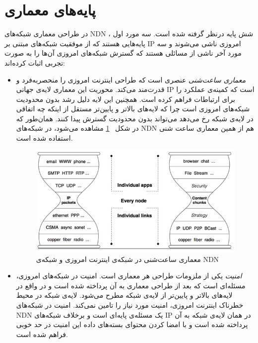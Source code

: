 \section{پایه‌های معماری}
در طراحی معماری شبکه‌های NDN ، شش پایه درنظر گرفته شده است. سه مورد اول پایه‌هایی هستند که از موفقیت شبکه‌های مبتنی بر IP امروزی ناشی می‌شوند و سه مورد آخر ناشی از مسائلی هستند که گسترش شبکه‌های امروزی آن‌ها را به صورت تجربی اثبات کرده‌اند: 
\begin{itemize}
\item{
\textit{معماری ساعت‌شنی}
 عنصری است که طراحی اینترنت امروزی را منحصربه‌فرد و قدرت‌مند می‌کند. محوریت این معماری لایه‌ی جهانی IP  است که کمینه‌ی عملکرد را برای ارتباطات فراهم کرده است. همچنین این لایه دلیل رشد بدون محدودیت شبکه‌های امروزی است چرا که لایه‌های بالاتر و پایین‌تر مستقل از اینکه چه اتفاقی در لایه‌ی شبکه رخ می‌دهد می‌تواند بدون محدودیت گسترش پیدا کنند. همان‌طور که در شکل
~\ref{fig:hourglass}
  مشاهده می‌شود، در شبکه‌های NDN هم از همین معماری ساعت شنی استفاده شده است. 


\begin{figure}[H]
\centering
\includegraphics[scale=0.8]{./resources/figures/3_hourglass.png}
\caption{معماری ساعت‌شنی در شبکه‌‌ی اینترنت امروزی و شبکه‌ی NDN}
\label{fig:hourglass}
\end{figure}




} 

\item{
\textit{امنیت}
 یکی از ملزومات طراحی هر معماری است. امنیت در شبکه‌های امروزی، مسئله‌ای است که بعد از طراحی معماری به آن پرداخته شده است و در واقع در لایه‌های بالاتر و پایین‌تر از لایه‌ی شبکه مطرح می‌شود. لایه‌ی شبکه در محیط خطرناک اینترنت امروزی، امنیت مورد نیاز را تامین نمی‌کند. امنیت در شبکه‌های NDN یک مسئله‌ی پایه‌ای است و برخلاف شبکه‌های IP در همان لایه‌ی شبکه به آن پرداخته شده است و با امضا کردن محتوای بسته‌های داده این امنیت در حد خوبی فراهم شده است. 

}
\end{itemize}
